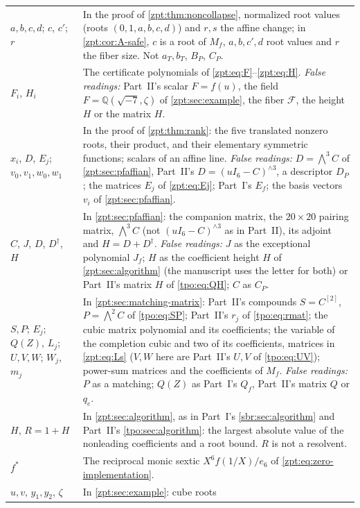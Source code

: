 \documentclass[11pt,letterpaper]{article}
\numberwithin{equation}{section}
\theoremstyle{definition}
\theoremstyle{remark}
\newcommand{\QQ}{\mathbb Q}
\begin{document}
\begin{center}
\begin{longtable}{@{}>{\raggedright\arraybackslash}p{}
 >{\raggedright\arraybackslash}p{}@{}}
$a,b,c,d$; $c$, $c'$; $r$ & In the proof of \cref{zpt:thm:noncollapse},
normalized root values (roots $(0,1,a,b,c,d)$) and $r,s$ the affine change;
in \cref{zpt:cor:A-safe}, $c$ is a root of $M_f$, $a,b,c',d$ root values and
$r$ the fiber size. Not $a_T,b_T$, $B_P$, $C_P$.\\[3pt]
$F_i$, $H_i$ & The certificate polynomials of
\eqref{zpt:eq:F}--\eqref{zpt:eq:H}. \emph{False readings:} Part~II's
scalar $F=f(u)$, the field $F=\QQ(\sqrt{-7},\zeta)$ of
\cref{zpt:sec:example}, the fiber $\mathcal F$, the height $H$ or the
matrix $H$.\\[3pt]
$x_i$, $D$, $E_j$; $v_0,v_1,w_0,w_1$ & In the proof of \cref{zpt:thm:rank}:
the five translated nonzero roots, their product, and their elementary
symmetric functions; scalars of an affine line. \emph{False readings:}
$D=\bigwedge^3C$ of \cref{zpt:sec:pfaffian}, Part~II's
$D=(uI_6-C)^{\wedge3}$, a descriptor $D_P$; the matrices $E_j$ of
\eqref{zpt:eq:Ej}; Part~I's $E_f$; the basis vectors $v_i$ of
\cref{zpt:sec:pfaffian}.\\[3pt]
$C$, $J$, $D$, $D^\dagger$, $H$ & In \cref{zpt:sec:pfaffian}: the
companion matrix, the $20\times20$ pairing matrix, $\bigwedge^3C$ (not
$(uI_6-C)^{\wedge3}$ as in Part~II), its adjoint and $H=D+D^\dagger$.
\emph{False readings:} $J$ as the exceptional polynomial $J_f$; $H$ as the
coefficient height $H$ of \cref{zpt:sec:algorithm} (the manuscript uses the
letter for both) or Part~II's matrix $H$ of \eqref{tpo:eq:QH}; $C$ as
$C_P$.\\[3pt]
$S,P$; $E_j$; $Q(Z)$, $L_j$; $U,V,W$; $W_j$, $m_j$ & In
\cref{zpt:sec:matching-matrix}: Part~II's compounds $S=C^{[2]}$,
$P=\bigwedge^2C$ of \eqref{tpo:eq:SP}; Part~II's $r_j$ of \eqref{tpo:eq:rmat};
the cubic matrix polynomial and its coefficients; the variable of the
completion cubic and two of its coefficients, matrices in \eqref{zpt:eq:Ls}
($V,W$ here are Part~II's $U,V$ of
\eqref{tpo:eq:UV}); power-sum matrices and the coefficients of $M_f$.
\emph{False readings:} $P$ as a matching; $Q(Z)$ as Part~I's $Q_f$,
Part~II's matrix $Q$ or $q_e$.\\[3pt]
$H$, $R=1+H$ & In \cref{zpt:sec:algorithm}, as in Part~I's
\cref{sbr:sec:algorithm} and Part~II's \cref{tpo:sec:algorithm}: the
largest absolute value of the nonleading coefficients and a root bound.
$R$ is not a resolvent.\\[3pt]
$f^*$ & The reciprocal monic sextic $X^6f(1/X)/e_6$ of
\eqref{zpt:eq:zero-implementation}.\\[3pt]
$u,v$, $y_1,y_2$, $\zeta$ & In \cref{zpt:sec:example}: cube roots

\end{longtable}
\end{center}
\end{document}
